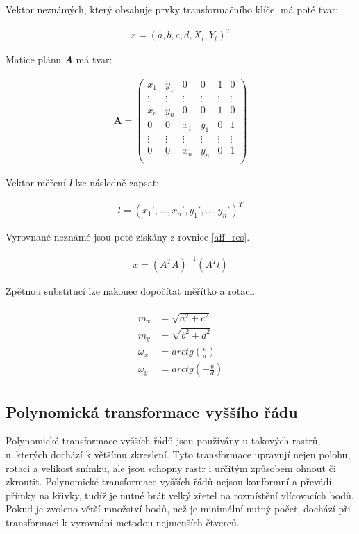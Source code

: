 \documentclass[thesis=M,czech]{FITthesis}[2012/06/26]
\begin{document}
Vektor neznámých, který obsahuje prvky transformačního klíče, má poté tvar:

\begin{align} \label{aff_klic}
x = (a, b, c, d, X_t, Y_t)^T
\end{align}

Matice plánu \textbf{\textit{A}} má tvar:

\begin{align} \label{aff_matA}
\boldsymbol {A} = \begin{pmatrix}
    x_1 & y_1 & 0 & 0 & 1 & 0 \\
    \vdots & \vdots & \vdots & \vdots & \vdots & \vdots \\
    x_n & y_n & 0 & 0 & 1 & 0 \\
    0 & 0 & x_1 & y_1 & 0 & 1 \\
    \vdots & \vdots & \vdots & \vdots & \vdots & \vdots \\
    0 & 0 & x_n & y_n & 0 & 1 \\
\end{pmatrix}
\end{align}

Vektor měření \textbf{\textit{l}} lze následně zapsat:

\begin{align} \label{aff_l}
l = (x_1', \ldots , x_n', y_1', \ldots , y_n')^T
\end{align}

Vyrovnané neznámé jsou poté získány z rovnice \eqref{aff_res}.

\begin{align} \label{aff_res}
x = (A^TA)^{-1} (A^Tl)
\end{align}

Zpětnou substitucí lze nakonec dopočítat měřítko a rotaci.

\begin{align} \label{aff_vysledek}
\begin{split}
m_x &= \sqrt{a^2 + c^2} \\
m_y &= \sqrt{b^2 + d^2} \\
\omega_x &= arctg(\frac{c}{a}) \\
\omega_y &= arctg(-\frac{b}{d}) 
\end{split}
\end{align}

\subsection{Polynomická transformace vyššího řádu}
Polynomické transformace vyšších řádů jsou používány u takových rastrů, u~kterých dochází k většímu zkreslení. Tyto transformace upravují nejen polohu, rotaci a velikost snímku, ale jsou schopny rastr i určitým způsobem ohnout či zkroutit. Polynomické transformace vyšších řádů nejsou konformní a převádí přímky na křivky, tudíž je nutné brát velký zřetel na rozmístění vlícovacích bodů. Pokud je zvoleno větší množství bodů, než je minimální nutný počet, dochází při transformaci k vyrovnání metodou nejmenších čtverců. 
\end{document}
